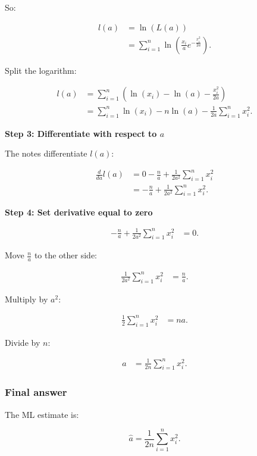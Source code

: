 \documentclass[10pt]{article}
\begin{document}
So:

\begin{align*}
l(a)
&=\ln(L(a)) \\[2mm]
&=
\sum_{i=1}^{n}
\ln\left(
\frac{x_i}{a}
e^{-\frac{x_i^2}{2a}}
\right).
\end{align*}

Split the logarithm:

\begin{align*}
l(a)
&=
\sum_{i=1}^{n}
\left(
\ln(x_i)-\ln(a)
-\frac{x_i^2}{2a}
\right) \\[2mm]
&=
\sum_{i=1}^{n}\ln(x_i)
-n\ln(a)
-\frac{1}{2a}
\sum_{i=1}^{n}x_i^2.
\end{align*}

\textbf{Step 3: Differentiate with respect to \(a\)}

The notes differentiate \(l(a)\):

\begin{align*}
\frac{d}{da}l(a)
&=
0-\frac{n}{a}
+
\frac{1}{2a^2}
\sum_{i=1}^{n}x_i^2 \\[2mm]
&=
-\frac{n}{a}
+
\frac{1}{2a^2}
\sum_{i=1}^{n}x_i^2.
\end{align*}

\textbf{Step 4: Set derivative equal to zero}

\begin{align*}
-\frac{n}{a}
+
\frac{1}{2a^2}
\sum_{i=1}^{n}x_i^2
&=0.
\end{align*}

Move \(\frac{n}{a}\) to the other side:

\begin{align*}
\frac{1}{2a^2}
\sum_{i=1}^{n}x_i^2
&=
\frac{n}{a}.
\end{align*}

Multiply by \(a^2\):

\begin{align*}
\frac{1}{2}
\sum_{i=1}^{n}x_i^2
&=
na.
\end{align*}

Divide by \(n\):

\begin{align*}
a
&=
\frac{1}{2n}
\sum_{i=1}^{n}x_i^2.
\end{align*}

\subsubsection*{Final answer}
The ML estimate is:

\[
\hat a
=
\frac{1}{2n}
\sum_{i=1}^{n}x_i^2.
\]
\end{document}
